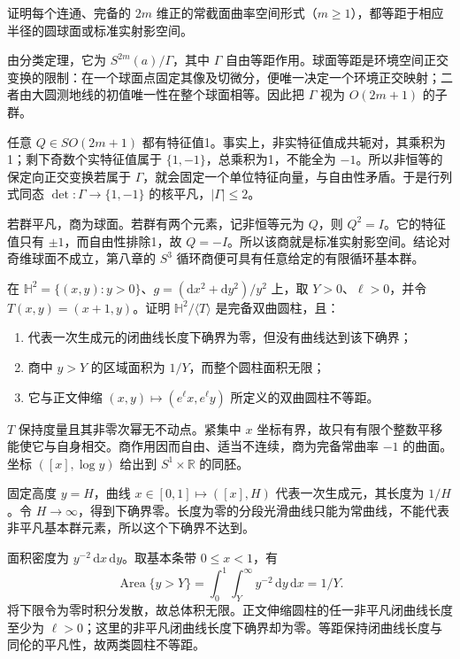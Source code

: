 \begin{exercise}\label{g3:ex:even-spherical-spaceforms}
	证明每个连通、完备的 \(2m\) 维正的常截面曲率空间形式（\(m\ge1\)），都等距于相应半径的圆球面或标准实射影空间。
\end{exercise}
\begin{solution}
	由分类定理，它为 \(S^{2m}(a)/\Gamma\)，其中 \(\Gamma\) 自由等距作用。球面等距是环境空间正交变换的限制：在一个球面点固定其像及切微分，便唯一决定一个环境正交映射；二者由大圆测地线的初值唯一性在整个球面相等。因此把 \(\Gamma\) 视为 \(O(2m+1)\) 的子群。

	任意 \(Q\in SO(2m+1)\) 都有特征值1。事实上，非实特征值成共轭对，其乘积为1；剩下奇数个实特征值属于 \(\{1,-1\}\)，总乘积为1，不能全为 \(-1\)。所以非恒等的保定向正交变换若属于 \(\Gamma\)，就会固定一个单位特征向量，与自由性矛盾。于是行列式同态 \(\det:\Gamma\to\{1,-1\}\) 的核平凡，\(|\Gamma|\le2\)。

	若群平凡，商为球面。若群有两个元素，记非恒等元为 \(Q\)，则 \(Q^2=I\)。它的特征值只有 \(\pm1\)，而自由性排除1，故 \(Q=-I\)。所以该商就是标准实射影空间。结论对奇维球面不成立，第八章的 \(S^3\) 循环商便可具有任意给定的有限循环基本群。
\end{solution}

\begin{exercise}\label{g3:ex:parabolic-hyperbolic-cylinder}
	在 \(\mathbb H^2=\{(x,y):y>0\}\)、\(g=(\mathrm dx^2+\mathrm dy^2)/y^2\) 上，取 \(Y>0\)、\(\ell>0\)，并令 \(T(x,y)=(x+1,y)\)。证明 \(\mathbb H^2/\langle T\rangle\) 是完备双曲圆柱，且：
	\begin{enumerate}
		\item 代表一次生成元的闭曲线长度下确界为零，但没有曲线达到该下确界；
		\item 商中 \(y>Y\) 的区域面积为 \(1/Y\)，而整个圆柱面积无限；
		\item 它与正文伸缩 \((x,y)\mapsto(e^\ell x,e^\ell y)\) 所定义的双曲圆柱不等距。
	\end{enumerate}
\end{exercise}
\begin{solution}
	\(T\) 保持度量且其非零次幂无不动点。紧集中 \(x\) 坐标有界，故只有有限个整数平移能使它与自身相交。商作用因而自由、适当不连续，商为完备常曲率 \(-1\) 的曲面。坐标 \(([x],\log y)\) 给出到 \(S^1\times\mathbb R\) 的同胚。

	固定高度 \(y=H\)，曲线 \(x\in[0,1]\mapsto([x],H)\) 代表一次生成元，其长度为 \(1/H\)。令 \(H\to\infty\)，得到下确界零。长度为零的分段光滑曲线只能为常曲线，不能代表非平凡基本群元素，所以这个下确界不达到。

	面积密度为 \(y^{-2}\,\mathrm dx\,\mathrm dy\)。取基本条带 \(0\le x<1\)，有
	\[
		\operatorname{Area}\{y>Y\}
		=\int_0^1\int_Y^\infty y^{-2}\,\mathrm dy\,\mathrm dx=1/Y.
	\]
	将下限令为零时积分发散，故总体积无限。正文伸缩圆柱的任一非平凡闭曲线长度至少为 \(\ell>0\)；这里的非平凡闭曲线长度下确界却为零。等距保持闭曲线长度与同伦的平凡性，故两类圆柱不等距。
\end{solution}

